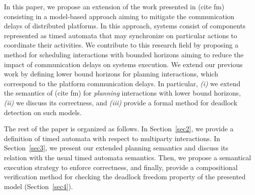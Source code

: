 \indent In this paper, we propose an extension of the work presented in (cite fm) 
consisting in a model-based approach aiming to mitigate the communication delays of 
distributed platforms. In this approach, systems consist of components represented 
as timed automata that may synchronize on particular actions to coordinate 
their activities. We contribute to this research field by proposing a method for 
scheduling interactions with bounded horizons aiming to reduce the impact of 
communication delays on systems execution.
We extend our previous work by defining lower bound horizons for planning interactions, 
which correspond to the platform communication delays.
In particular, \emph{(i)} we extend the semantics of (cite fm) for \emph{planning} interactions with 
lower bound horizons, \emph{(ii)} we discuss its correctness, and \emph{(iii)} 
provide a formal method for deadlock detection on such models. 

The rest of the paper is organized as follows. In Section~\ref{sec2}, 
we provide a definition of timed automata with respect to multiparty interactions. 
In Section~\ref{sec3}, we present our extended planning semantics and discuss
its relation with the usual timed automata semantics. Then, we propose a 
semantical execution strategy to enforce correctness, and finally,
provide a compositional verification method for checking the deadlock
freedom property of the presented model (Section~\ref{sec4}). 

